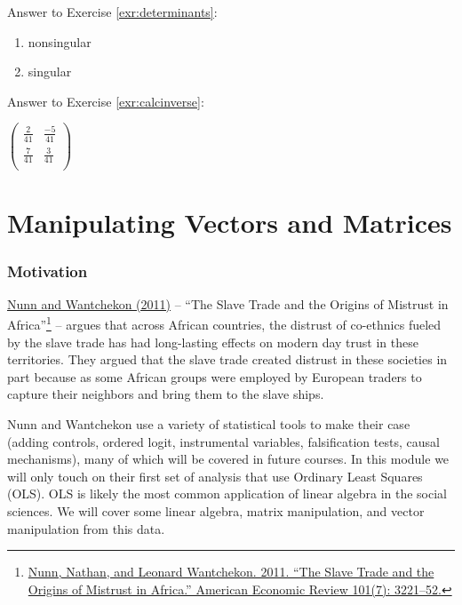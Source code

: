 \documentclass[
]{book}
\theoremstyle{definition}
\theoremstyle{definition}
\theoremstyle{definition}
\theoremstyle{definition}
\theoremstyle{remark}
\begin{document}
Answer to Exercise \ref{exr:determinants}:

\begin{enumerate}
\def\labelenumi{\arabic{enumi}.}
\item
  nonsingular
\item
  singular
\end{enumerate}

Answer to Exercise \ref{exr:calcinverse}:

\(\begin{pmatrix}  \frac{2}{41} & \frac{-5}{41}\\  \frac{7}{41} & \frac{3}{41}\\  \end{pmatrix}\)

\hypertarget{rmatrices}{%
\chapter{Manipulating Vectors and Matrices}\label{rmatrices}}

\hypertarget{motivation-2}{%
\subsection*{Motivation}\label{motivation-2}}

\href{https://dash.harvard.edu/bitstream/handle/1/11986331/nunn-slave-trade.pdf}{Nunn and Wantchekon (2011)} -- ``The Slave Trade and the Origins of Mistrust in Africa''\footnote{\href{https://dash.harvard.edu/bitstream/handle/1/11986331/nunn-slave-trade.pdf}{Nunn, Nathan, and Leonard Wantchekon. 2011. ``The Slave Trade and the Origins of Mistrust in Africa.'' American Economic Review 101(7): 3221--52.}} -- argues that across African countries, the distrust of co-ethnics fueled by the slave trade has had long-lasting effects on modern day trust in these territories. They argued that the slave trade created distrust in these societies in part because as some African groups were employed by European traders to capture their neighbors and bring them to the slave ships.

Nunn and Wantchekon use a variety of statistical tools to make their case (adding controls, ordered logit, instrumental variables, falsification tests, causal mechanisms), many of which will be covered in future courses. In this module we will only touch on their first set of analysis that use Ordinary Least Squares (OLS). OLS is likely the most common application of linear algebra in the social sciences. We will cover some linear algebra, matrix manipulation, and vector manipulation from this data.
\end{document}
